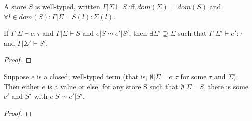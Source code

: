 \begin{dfn}
  A store $S$ is well-typed, written $\Gamma | \Sigma \vdash S$ iff
  $dom(\Sigma) = dom(S)$ and $\forall l \in dom(S) : \Gamma | \Sigma
  \vdash S(l) : \Sigma(l)$.
\end{dfn}


\begin{thm}[Preservation]
If $\Gamma | \Sigma \vdash e {:} \tau$ and $\Gamma | \Sigma \vdash S$
and $e | S \leadsto e' | S'$, then $\exists \Sigma' \supseteq \Sigma$
such that $\Gamma | \Sigma' \vdash e' {:} \tau$ and $\Gamma | \Sigma'
\vdash S'$.
\end{thm}

\begin{proof}
\end{proof}


\begin{thm}[Progress]
Suppose $e$ is a closed, well-typed term (that is, $\emptyset | \Sigma \vdash e {:} \tau$ for some $\tau$ and $\Sigma$). Then either $e$ is a value or else, for any store S such that $\emptyset | \Sigma \vdash S$, there is some $e'$ and $S'$ with $e | S \leadsto e' | S'$.
\end{thm}

\begin{proof}
\end{proof}
